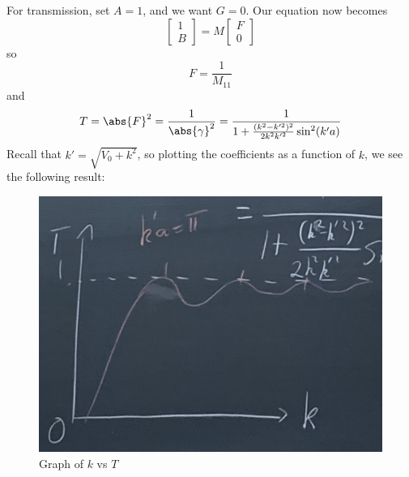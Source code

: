 \documentclass[a4paper,twoside,master.tex]{subfiles}
\begin{document}
For transmission, set $ A=1 $, and we want $ G=0 $. Our equation now becomes
\begin{equation}
    \begin{bmatrix}
        1\\B
    \end{bmatrix}
    = M 
    \begin{bmatrix}
        F\\0
    \end{bmatrix}
\end{equation}
so
\begin{equation}
    F = \frac{1}{M_{11}}
\end{equation}
and
\begin{equation}
    T = \abs{F}^2 = \frac{1}{\abs{\gamma}^2} = \frac{1}{1 + \frac{(k^2 - k'^2 )^2}{2 k^2 k'^2} \sin^2(k'a)}
\end{equation}
Recall that $ k' = \sqrt{V_0 + k^2} $, so plotting the coefficients as a function of $ k $, we see the following result:
\begin{figure}[h]
    \centering
    \includegraphics[width=\textwidth/2]{figures/lec_29_k_vs_T.jpg}
    \caption{Graph of $ k $ vs $ T $}
    \label{fig:k_vs_T_square_well}
\end{figure}
\end{document}
